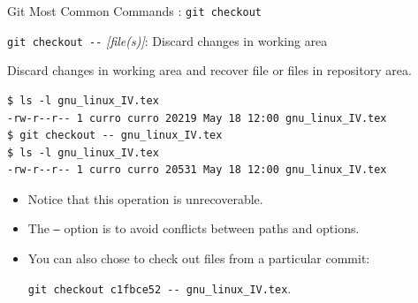 \begin{frame}[t,fragile]{Git Most Common Commands : \alert{\texttt{git checkout}}}
      \begin{block}{\alert{\texttt{git checkout {-}{-}} \emph{[file(s)]}}: Discard changes in working area}
        {\scriptsize
          Discard changes in \alert{working} area and recover file or files in \alert{repository} area. 
          \begin{lstlisting}
$ ls -l gnu_linux_IV.tex
-rw-r--r-- 1 curro curro 20219 May 18 12:00 gnu_linux_IV.tex
$ git checkout -- gnu_linux_IV.tex
$ ls -l gnu_linux_IV.tex
-rw-r--r-- 1 curro curro 20531 May 18 12:00 gnu_linux_IV.tex
\end{lstlisting}
\begin{itemize}
  \item Notice that this operation is  \alert{unrecoverable}.

\item The \texttt{--} option is to avoid conflicts between paths and options.

\item You can also chose to check out files from a particular commit:

\texttt{git checkout c1fbce52 {-}{-} gnu\_linux\_IV.tex}.
\end{itemize}
}      
\end{block}  
  
\end{frame}
